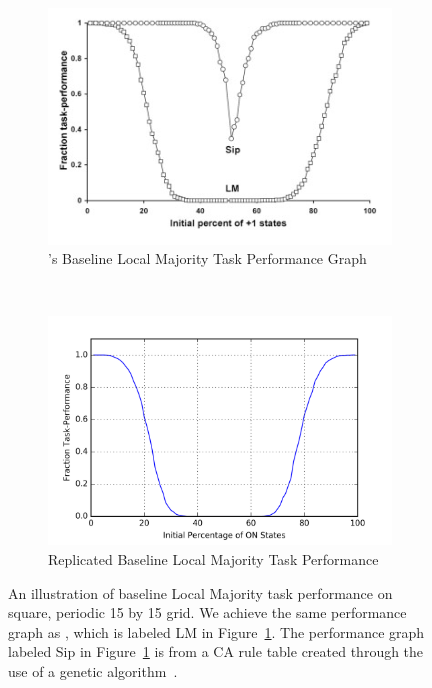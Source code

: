 \documentclass[a4paper,11pt]{report}
\begin{document}
\begin{figure}[htp]
\centering
  \begin{subfigure}[t]{0.6\textwidth}
  \includegraphics[width=\textwidth]{ch5_figs/me07_fig2_LMBaseline}
  \caption{\citeauthor{me07}'s Baseline Local Majority Task Performance Graph}
  \label{fig:me07_baseline}
  \end{subfigure}
  ~
  \begin{subfigure}[t]{0.6\textwidth}
  \centering
  \includegraphics[width=\textwidth]{ch5_figs/lm_baseline_reg_tor}
  \caption{Replicated Baseline Local Majority Task Performance}
  \end{subfigure}
\caption[Replication of \citeauthor{me07}'s Baseline Local Majority Performance]{
  An illustration of baseline Local Majority task performance on square, periodic 15 by 15 grid. We achieve the same performance graph as \citeauthor{me07}, which is labeled LM in Figure~\ref{fig:me07_baseline}. The performance graph labeled Sip in Figure~\ref{fig:me07_baseline} is from a CA rule table created through the use of a genetic algorithm~\cite{me07}.
}
\label{fig:me07_baseline_rep}
\end{figure}
\end{document}
